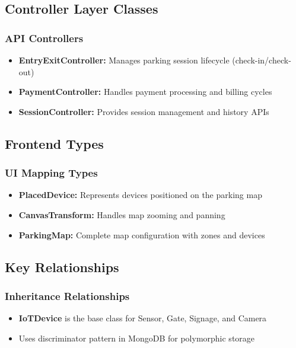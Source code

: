 \subsection{Controller Layer Classes}

\subsubsection{API Controllers}
\begin{itemize}
\item \textbf{EntryExitController:} Manages parking session lifecycle (check-in/check-out)
\item \textbf{PaymentController:} Handles payment processing and billing cycles
\item \textbf{SessionController:} Provides session management and history APIs
\end{itemize}

\subsection{Frontend Types}

\subsubsection{UI Mapping Types}
\begin{itemize}
\item \textbf{PlacedDevice:} Represents devices positioned on the parking map
\item \textbf{CanvasTransform:} Handles map zooming and panning
\item \textbf{ParkingMap:} Complete map configuration with zones and devices
\end{itemize}

\subsection{Key Relationships}

\subsubsection{Inheritance Relationships}
\begin{itemize}
\item \textbf{IoTDevice} is the base class for Sensor, Gate, Signage, and Camera
\item Uses discriminator pattern in MongoDB for polymorphic storage
\end{itemize}

